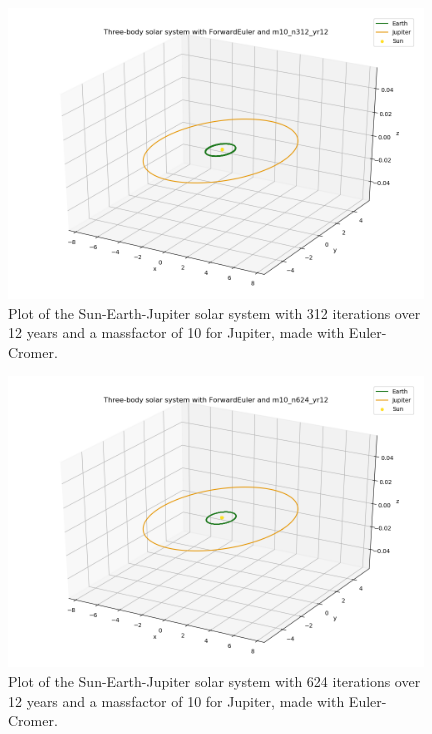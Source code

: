 \documentclass{article}
\begin{document}
    \begin{figure}[H]
        \centering
        \includegraphics[width = 11cm]{img/plot3D_S_E_J_F_m10_n312_yr12.png}
        \caption{Plot of the Sun-Earth-Jupiter solar system with 312 iterations over 12 years and a massfactor of 10 for Jupiter, made with Euler-Cromer.}
        \label{fig:plot3D_S_E_J_F_m10_n312_yr12}
    \end{figure}

    \begin{figure}[H]
        \centering
        \includegraphics[width = 11cm]{img/plot3D_S_E_J_F_m10_n624_yr12.png}
        \caption{Plot of the Sun-Earth-Jupiter solar system with 624 iterations over 12 years and a massfactor of 10 for Jupiter, made with Euler-Cromer.}
        \label{fig:plot3D_S_E_J_F_m10_n624_yr12}
    \end{figure}
\end{document}
